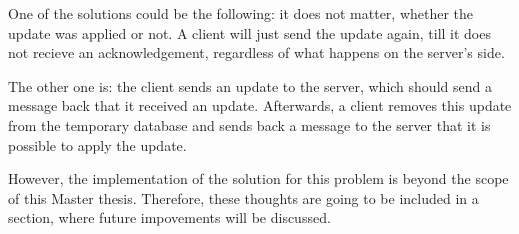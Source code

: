 One of the solutions could be the following: it does not matter, whether the update was applied or not. A client will just send the update again, till it does not recieve an acknowledgement, regardless of what happens on the server's side.

The other one is: the client sends an update to the server, which should send a message back that it received an update. Afterwards, a client removes this update from the temporary database and sends back a message to the server that it is possible to apply the update.

However, the implementation of the solution for this problem is beyond the scope of this Master thesis. Therefore, these thoughts are going to be included in a section, where future impovements will be discussed.